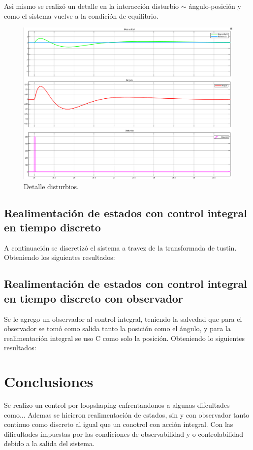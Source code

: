 Asi mismo se realizó un detalle en la interacción disturbio $\sim$ ángulo-posici\'on y como el sistema vuelve a la condici\'on de equilibrio.
\begin{figure}[H]
	\centering
	\includegraphics[width=1\linewidth]{Imagenes/Control_por_realimentacion_integral/detalle_disturbio.png}
	\caption{Detalle disturbios.}
	\label{realmentacion_disturbio}
\end{figure}
\subsection{Realimentaci\'on de estados con control integral en tiempo discreto}
A continuaci\'on se discretiz\'o el sistema a travez de la transformada de tustin. Obteniendo los siguientes resultados:



\subsection{Realimentaci\'on de estados con control integral en tiempo discreto con observador}
Se le agrego un observador al control integral, teniendo la salvedad que para el observador se tom\'o como salida tanto la posici\'on como el \'angulo, y para la realimentaci\'on integral se uso C como solo la posici\'on. Obteniendo lo siguientes resultados:


\section{Conclusiones}
Se realizo un control por loopshaping enfrentandonos a algunas difcultades como...
Ademas se hicieron realimentación de estados, sin y con observador tanto continuo como discreto al igual que un conotrol con acción integral.
Con las dificultades impuestas por las condiciones de observabilidad y o controlabilidad debido a la salida del sistema.

